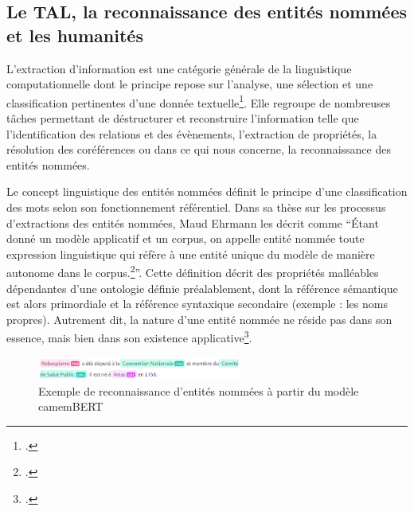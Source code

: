     \subsection{Le TAL, la reconnaissance des entités nommées et les humanités}
    
    L'extraction d'information est une catégorie générale de la linguistique computationnelle dont le principe repose sur l'analyse, une sélection et une classification pertinentes d'une donnée textuelle\footcite{poibeauExtractionInformationNouvelle1999}. Elle regroupe de nombreuses tâches permettant de déstructurer et reconstruire l'information telle que l'identification des relations et des évènements, l'extraction de propriétés, la résolution des coréférences ou dans ce qui nous concerne, la reconnaissance des entités nommées.
    
    Le concept linguistique des entités nommées définit le principe d'une classification des mots selon son fonctionnement référentiel. Dans sa thèse sur les processus d'extractions des entités nommées, Maud Ehrmann les décrit comme \enquote{Étant donné un modèle applicatif et un corpus, on appelle entité nommée toute expression linguistique qui réfère à une entité unique du modèle de manière autonome dans le corpus.\footcite[p.~167-168]{ehrmannEntiteesNommeesLinguistique2008}}. Cette définition décrit des propriétés malléables dépendantes d'une ontologie définie préalablement, dont la référence sémantique est alors primordiale et la référence syntaxique secondaire (exemple : les noms propres). Autrement dit, la nature d'une entité nommée ne réside pas dans son essence, mais bien dans son existence applicative\footcite[p.~167-168]{ehrmannEntiteesNommeesLinguistique2008}.
    
    \begin{figure}
        \centering
        \includegraphics[width=0.6\textwidth]{annexes/img/entites.png}
        \caption{Exemple de reconnaissance d'entités nommées à partir du modèle camemBERT}
        \label{fig:entités}
    \end{figure}
    

